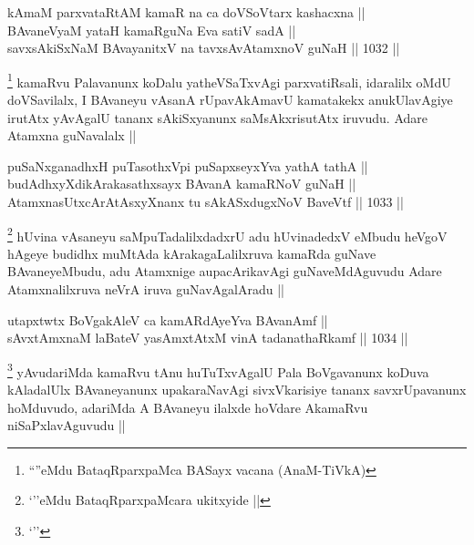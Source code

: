 \begin{shl}
kAmaM parxvataRtAM kamaR na ca doVSoV\s tarx kashacxna ||  \\
BAvaneVyaM yataH kamaRguNa Eva satiV sadA || \\
savxsAkiSxNaM BAvayanitxV na tavxsAvAtamxnoV guNaH ||  1032 ||  
\end{shl}

\begin{artha}
\footnote{``\stext''eMdu BataqRparxpaMca BASayx vacana (AnaM-TiVkA)}
kamaRvu Palavanunx koDalu yatheVSaTxvAgi parxvatiRsali, idaralilx oMdU doVSavilalx, I BAvaneyu vAsanA rUpavAkAmavU kamatakekx anukUlavAgiye irutAtx yAvAgalU tananx sAkiSxyanunx saMsAkxrisutAtx iruvudu. Adare Atamxna guNavalalx || 
\end{artha}

\begin{shl}
puSaNxganadhxH puTasothxV\s pi puSapxseyxYva yathA tathA || \\
budAdhxyXdikArakasathxsayx BAvanA kamaRNoV guNaH || \\
AtamxnasUtxcArAtAsxyXnanx tu sAkASxdugxNoV BaveVtf ||  1033 || 
\end{shl}

\begin{artha}
\footnote{`\stext''eMdu BataqRparxpaMcara ukitxyide ||}
hUvina vAsaneyu saMpuTadalilxdadxrU adu hUvinadedxV eMbudu heVgoV hAgeye budidhx muMtAda kArakagaLalilxruva kamaRda guNave BAvaneyeMbudu, adu Atamxnige aupacArikavAgi guNaveMdAguvudu Adare Atamxnalilxruva neVrA iruva guNavAgalAradu ||
\end{artha}


\begin{shl}
utapxtwtx BoVgakAleV ca kamAR\s \s dAyeYva BAvanAmf || \\
sAvxtAmxnaM laBateV yasAmxtAtxM vinA tadanathaRkamf ||  1034 ||  
\end{shl}

\begin{artha}
\footnote{`\stext''}
yAvudariMda kamaRvu tAnu huTuTxvAgalU Pala BoVgavanunx koDuva kAladalUlx BAvaneyanunx upakaraNavAgi sivxVkarisiye tananx savxrUpavanunx hoMduvudo, adariMda A BAvaneyu ilalxde hoVdare AkamaRvu niSaPxlavAguvudu ||
\end{artha}

